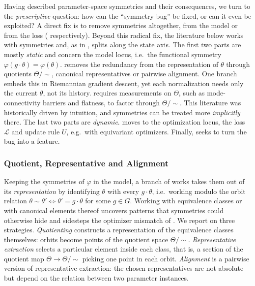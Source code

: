\documentclass[mathematics,review,submit,moreauthors]{Definitions/mdpi}
\begin{document}
Having described parameter-space symmetries and their consequences, we turn to the \emph{prescriptive} question: how can the ``symmetry bug'' be fixed, or can it even be exploited?
A direct fix is to remove symmetries altogether, from the model \citep{lim2024} or from the loss \citep{ziyin2024b} ( respectively).
Beyond this radical fix, the literature below works with symmetries and, as in , splits along the state axis.
The first two parts are mostly \emph{static} and concern the model locus, i.e.\ the functional symmetry $\varphi(g\cdot\theta)=\varphi(\theta)$.
 removes the redundancy from the representation of $\theta$ through quotients $\Theta/\!\sim$, canonical representatives or pairwise alignment.
One branch embeds this in Riemannian gradient descent, yet each normalization needs only the current $\theta$, not its history.
 requires measurements on $\Theta$, such as mode-connectivity barriers and flatness, to factor through $\Theta/\!\sim$.
This literature was historically driven by intuition, and symmetries can be treated more \emph{implicitly} there.
The last two parts are \emph{dynamic}.
 moves to the optimization locus, the loss $\mathcal L$ and update rule $U$, e.g.\ with equivariant optimizers.
Finally,  seeks to turn the bug into a feature.

\subsubsection{Quotient, Representative and Alignment}\label{sec:quotient-repr-align}
Keeping the symmetries of $\varphi$ in the model, a branch of works takes them out of its \emph{representation} by identifying $\theta$ with every $g\cdot\theta$, i.e.\ working modulo the orbit relation $\theta\sim\theta' \iff \theta'=g\cdot\theta$ for some $g\in G$.
Working with equivalence classes or with canonical elements thereof uncovers patterns that symmetries could otherwise hide and sidesteps the optimizer mismatch of .
We report on three strategies.
\emph{Quotienting} constructs a representation of the equivalence classes themselves: orbits become points of the quotient space $\Theta/\!\sim$.
\emph{Representative extraction} selects a particular element inside each class, that is, a section of the quotient map $\Theta\to\Theta/\!\sim$ picking one point in each orbit.
\emph{Alignment} is a pairwise version of representative extraction: the chosen representatives are not absolute but depend on the relation between two parameter instances.
\end{document}

